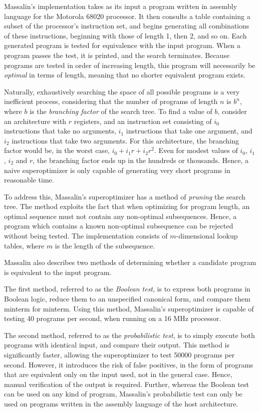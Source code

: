 \documentclass[a4paper,11pt]{kth-mag}
\begin{document}
Massalin's implementation takes as its input a program written in assembly language for the Motorola 68020 processor.
It then consults a table containing a subset of the processor's instruction set, and begins generating all combinations of these instructions, beginning with those of length 1, then 2, and so on.
Each generated program is tested for equivalence with the input program.
When a program passes the test, it is printed, and the search terminates.
Because programs are tested in order of increasing length, this program will necessarily be \emph{optimal} in terms of length, meaning that no shorter equivalent program exists.

Naturally, exhaustively searching the space of all possible programs is a very inefficient process, considering that the number of programs of length $n$ is $b^n$, where $b$ is the \emph{branching factor} of the search tree.
To find a value of $b$, consider an architecture with $r$ registers, and an instruction set consisting of $i_0$ instructions that take no arguments, $i_1$ instructions that take one argument, and $i_2$ instructions that take two arguments.
For this architecture, the branching factor would be, in the worst case, $i_0+i_1r+i_2r^2$.
Even for modest values of $i_0$, $i_1$, $i_2$ and $r$, the branching factor ends up in the hundreds or thousands.
Hence, a naive superoptimizer is only capable of generating very short programs in reasonable time.

To address this, Massalin's superoptimizer has a method of \emph{pruning} the search tree.
The method exploits the fact that when optimizing for program length, an optimal sequence must not contain any non-optimal subsequences.
Hence, a program which contains a known non-optimal subsequence can be rejected without being tested.
The implementation consists of $m$-dimensional lookup tables, where $m$ is the length of the subsequence.

Massalin also describes two methods of determining whether a candidate program is equivalent to the input program.

The first method, referred to as the \emph{Boolean test}, is to express both programs in Boolean logic, reduce them to an unspecified canonical form, and compare them minterm for minterm.
Using this method, Massalin's superoptimizer is capable of testing 40 programs per second, when running on a 16 MHz processor.

The second method, referred to as the \emph{probabilistic test}, is to simply execute both programs with identical input, and compare their output.
This method is significantly faster, allowing the superoptimizer to test 50000 programs per second.
However, it introduces the risk of false positives, in the form of programs that are equivalent only on the input used, not in the general case.
Hence, manual verification of the output is required.
Further, whereas the Boolean test can be used on any kind of program, Massalin's probabilistic test can only be used on programs written in the assembly language of the host architecture.
\end{document}
